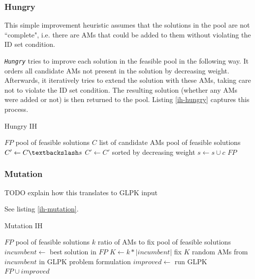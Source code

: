 \documentclass[a4paper,12pt,oneside]{report}
\newcommand{\heu}[1]{\texttt{\textit{#1}}}
\begin{document}
\subsubsection{Hungry}

This simple improvement heuristic assumes that the solutions in the pool are not ``complete", i.e. there are AMs that could be added to them without violating the ID set condition.

\heu{Hungry} tries to improve each solution in the feasible pool in the following way. It orders all candidate AMs not present in the solution by decreasing weight. Afterwards, it iteratively tries to extend the solution with these AMs, taking care not to violate the ID set condition. The resulting solution (whether any AMs were added or not) is then returned to the pool. Listing \ref{ih-hungry} captures this process.

\begin{algorithm}
\caption{Hungry IH}
\label{ih-hungry}
\begin{algorithmic}
\REQUIRE $FP$ pool of feasible solutions
\REQUIRE $C$ list of candidate AMs
\ENSURE pool of feasible solutions
  \STATE {}
  \STATE $C' \gets C \textbackslash s$
  \STATE $C' \gets C'$ sorted by decreasing weight
      \STATE $s \gets s \cup c$
    \ENDIF
  \ENDFOR
\ENDFOR
\RETURN $FP$
\end{algorithmic}
\end{algorithm}

\subsubsection{Mutation}

TODO explain how this translates to GLPK input

See listing \ref{ih-mutation}.

\begin{algorithm}
\caption{Mutation IH}
\label{ih-mutation}
\begin{algorithmic}
\REQUIRE $FP$ pool of feasible solutions
\REQUIRE $k$ ratio of AMs to fix
\ENSURE pool of feasible solutions
\STATE $incumbent \gets $ best solution in $FP$ 
\STATE $K \gets k * |incumbent|$
\STATE fix $K$ random AMs from $incumbent$ in GLPK problem formulation
\STATE $improved \gets $ run GLPK
\RETURN $FP \cup improved$
\end{algorithmic}
\end{algorithm}
\end{document}
